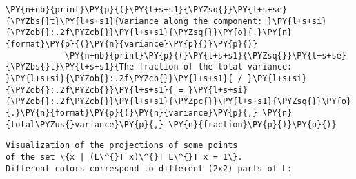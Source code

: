 \begin{Verbatim}[commandchars=\\\{\}]
            \PY{n+nb}{print}\PY{p}{(}\PY{l+s+s1}{\PYZsq{}}\PY{l+s+se}{\PYZbs{}t}\PY{l+s+s1}{Variance along the component: }\PY{l+s+si}{\PYZob{}:.2f\PYZcb{}}\PY{l+s+s1}{\PYZsq{}}\PY{o}{.}\PY{n}{format}\PY{p}{(}\PY{n}{variance}\PY{p}{)}\PY{p}{)}
            \PY{n+nb}{print}\PY{p}{(}\PY{l+s+s1}{\PYZsq{}}\PY{l+s+se}{\PYZbs{}t}\PY{l+s+s1}{The fraction of the total variance: }\PY{l+s+si}{\PYZob{}:.2f\PYZcb{}}\PY{l+s+s1}{ / }\PY{l+s+si}{\PYZob{}:.2f\PYZcb{}}\PY{l+s+s1}{ = }\PY{l+s+si}{\PYZob{}:.2f\PYZcb{}}\PY{l+s+s1}{\PYZpc{}}\PY{l+s+s1}{\PYZsq{}}\PY{o}{.}\PY{n}{format}\PY{p}{(}\PY{n}{variance}\PY{p}{,} \PY{n}{total\PYZus{}variance}\PY{p}{,} \PY{n}{fraction}\PY{p}{)}\PY{p}{)}
\end{Verbatim}

    \begin{Verbatim}[commandchars=\\\{\}]
Visualization of the projections of some points 
of the set \{x | (L\^{}T x)\^{}T L\^{}T x = 1\}.
Different colors correspond to different (2x2) parts of L:

    \end{Verbatim}

    \begin{center}
    \end{center}
    { \hspace*{\fill} \\}
    

